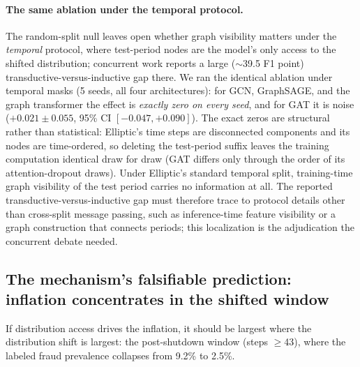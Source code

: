 \documentclass{article}
\begin{document}
\paragraph{The same ablation under the temporal protocol.} The random-split null
leaves open whether graph visibility matters under the \emph{temporal} protocol,
where test-period nodes are the model's only access to the shifted distribution;
concurrent work \citep{maganti2026liability} reports a large ($\sim$39.5 F1
point) transductive-versus-inductive gap there. We ran the identical ablation
under temporal masks (5 seeds, all four architectures): for GCN, GraphSAGE, and
the graph transformer the effect is \emph{exactly zero on every seed}, and for
GAT it is noise ($+0.021\pm0.055$, 95\% CI $[-0.047, +0.090]$). The exact zeros
are structural rather than statistical: Elliptic's time steps are disconnected
components and its nodes are time-ordered, so deleting the test-period suffix
leaves the training computation identical draw for draw (GAT differs only
through the order of its attention-dropout draws). Under Elliptic's standard
temporal split, training-time graph visibility of the test period carries no
information at all. The reported transductive-versus-inductive gap must
therefore trace to protocol details other than cross-split message passing,
such as inference-time feature visibility or a graph construction that connects
periods; this localization is the adjudication the concurrent debate needed.

\subsection{The mechanism's falsifiable prediction: inflation concentrates in the
shifted window}
\label{sec:windowed}
If distribution access drives the inflation, it should be largest where the
distribution shift is largest: the post-shutdown window (steps $\geq$43), where the
labeled fraud prevalence collapses from 9.2\% to 2.5\%.

\begin{table}[h]
\centering
\caption{Within-window results (5 seeds). Because PR-AUC's no-skill floor is
each window's prevalence (9.2\% pre, 2.5\% post), cross-window comparisons use
prevalence-normalized AP, $(\mathrm{AP}-\pi)/(1-\pi)$, reported as ``skill''.}
\label{tab:windowed}
\end{table}
\end{document}
